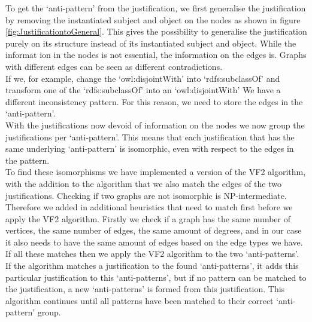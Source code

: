 \documentclass[11pt,letterpaper ,oneside ]{book}
\begin{document}
To get the `anti-pattern' from the justification, we first generalise the justification by removing the instantiated subject and object on the nodes as shown in figure \ref{fig:JustificationtoGeneral}. This gives the possibility to generalise the justification purely on its structure instead of its instantiated subject and object. While the informat
ion in the nodes is not essential, the information on the edges is. Graphs with different edges can be seen as different contradictions. \\
If we, for example, change the `owl:disjointWith' into `rdfs:subclassOf' and transform one of the `rdfs:subclassOf' into an `owl:disjointWith' We have a different inconsistency pattern. For this reason, we need to store the edges in the `anti-pattern'.\\
With the justifications now devoid of information on the nodes we now group the justifications per `anti-pattern'. This means that each justification that has the same underlying `anti-pattern' is isomorphic, even with respect to the edges in the pattern. \\
To find these isomorphisms we have implemented a version of the VF2 algorithm\cite{LCordella:2004}, with the addition to the algorithm that we also match the edges of the two justifications. Checking if two graphs are not isomorphic is NP-intermediate. Therefore we added in additional heuristics that need to match first before we apply the VF2 algorithm. Firstly we check if a graph has the same number of vertices, the same number of edges, the same amount of degrees, and in our case it also needs to have the same amount of edges based on the edge types we have. If all these matches then we apply the VF2 algorithm to the two `anti-patterns'. If the algorithm matches a justification to the found `anti-patterns', it adds this particular justification to this `anti-patterns', but if no pattern can be matched to the justification, a new `anti-patterns' is formed from this justification. This algorithm continues until all patterns have been matched to their correct `anti-pattern' group.\\
\end{document}
